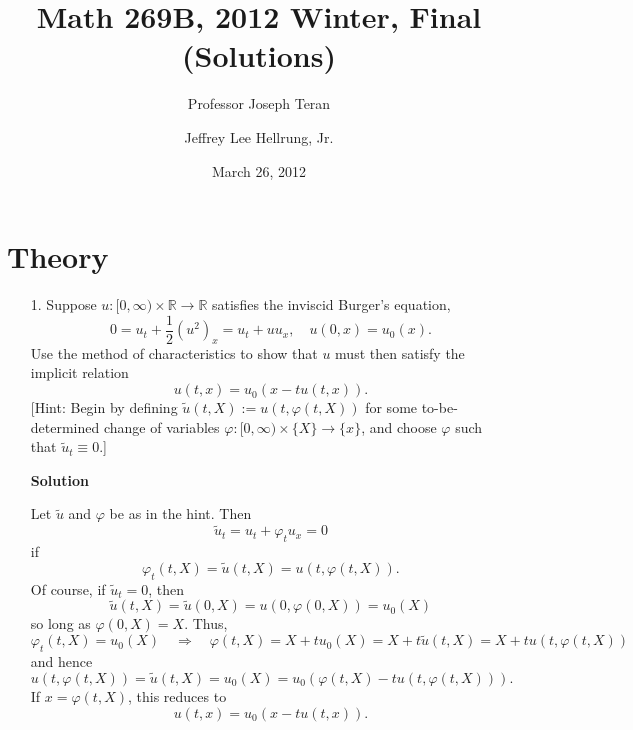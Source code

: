 \documentclass{article}
\begin{document}
\title{Math 269B, 2012 Winter, Final (Solutions)}
\date{March 26, 2012}
\author{Professor Joseph Teran \and Jeffrey Lee Hellrung, Jr.}
\maketitle

\section{Theory}

\begin{itemize}

\item[1.] Suppose $u \colon [0,\infty) \times \mathbb{R} \to \mathbb{R}$ satisfies the inviscid Burger's equation,
\begin{equation}\label{eq:burgers.strong}
0 = u_t + \frac{1}{2} \left( u^2 \right)_x = u_t + u u_x, \quad u(0,x) = u_0(x).
\end{equation}
Use the method of characteristics to show that $u$ must then satisfy the implicit relation
\begin{equation}\label{eq:burgers.implicit}
u(t,x) = u_0 \left( x - t u(t,x) \right).
\end{equation}
[Hint: Begin by defining $\tilde{u}(t,X) := u \left( t, \varphi(t,X) \right)$ for some to-be-determined change of variables $\varphi \colon [0,\infty) \times \{X\} \to \{x\}$, and choose $\varphi$ such that $\tilde{u}_t \equiv 0$.]

\textbf{Solution}

Let $\tilde{u}$ and $\varphi$ be as in the hint. Then
\begin{equation*}
\tilde{u}_t = u_t + \varphi_t u_x = 0
\end{equation*}
if
\begin{equation*}
\varphi_t(t,X) = \tilde{u}(t,X) = u(t,\varphi(t,X)).
\end{equation*}
Of course, if $\tilde{u}_t = 0$, then
\begin{equation*}
\tilde{u}(t,X) = \tilde{u}(0,X) = u(0,\varphi(0,X)) = u_0(X)
\end{equation*}
so long as $\varphi(0,X) = X$. Thus,
\begin{equation*}
\varphi_t(t,X) = u_0(X) \quad \Rightarrow \quad \varphi(t,X) = X + t u_0(X) = X + t \tilde{u}(t,X) = X + t u \left( t, \varphi(t,X) \right)
\end{equation*}
and hence
\begin{equation*}
u \left( t, \varphi(t,X) \right) = \tilde{u}(t,X) = u_0(X) = u_0 \left( \varphi(t,X) - t u \left( t, \varphi(t,X) \right) \right).
\end{equation*}
If $x = \varphi(t,X)$, this reduces to
\begin{equation*}
u(t,x) = u_0 \left( x - t u(t,x) \right).
\end{equation*}


\end{itemize}
\end{document}
